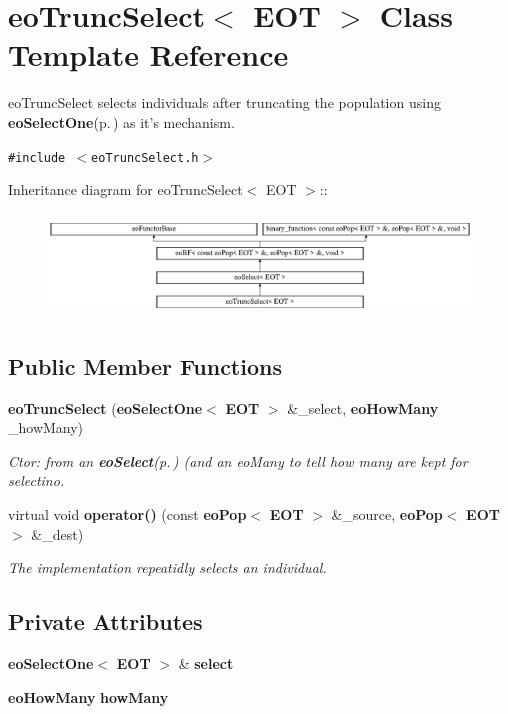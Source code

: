 \section{eo\-Trunc\-Select$<$ EOT $>$ Class Template Reference}
\label{classeo_trunc_select}
eo\-Trunc\-Select selects individuals after truncating the population using {\bf eo\-Select\-One}{\rm (p.\,\pageref{classeo_select_one})} as it's mechanism.  


{\tt \#include $<$eo\-Trunc\-Select.h$>$}

Inheritance diagram for eo\-Trunc\-Select$<$ EOT $>$::\begin{figure}[H]
\begin{center}
\leavevmode
\includegraphics[height=2.75184cm]{classeo_trunc_select}
\end{center}
\end{figure}
\subsection*{Public Member Functions}
\begin{CompactItemize}
\item 
{\bf eo\-Trunc\-Select} ({\bf eo\-Select\-One}$<$ {\bf EOT} $>$ \&\_\-select, {\bf eo\-How\-Many} \_\-how\-Many)\label{classeo_trunc_select_a0}

\begin{CompactList}\small\item\em Ctor: from an {\bf eo\-Select}{\rm (p.\,\pageref{classeo_select})} (and an eo\-Many to tell how many are kept for selectino. \item\end{CompactList}\item 
virtual void {\bf operator()} (const {\bf eo\-Pop}$<$ {\bf EOT} $>$ \&\_\-source, {\bf eo\-Pop}$<$ {\bf EOT} $>$ \&\_\-dest)
\begin{CompactList}\small\item\em The implementation repeatidly selects an individual. \item\end{CompactList}\end{CompactItemize}
\subsection*{Private Attributes}
\begin{CompactItemize}
\item 
{\bf eo\-Select\-One}$<$ {\bf EOT} $>$ \& {\bf select}\label{classeo_trunc_select_r0}

\item 
{\bf eo\-How\-Many} {\bf how\-Many}\label{classeo_trunc_select_r1}

\end{CompactItemize}


